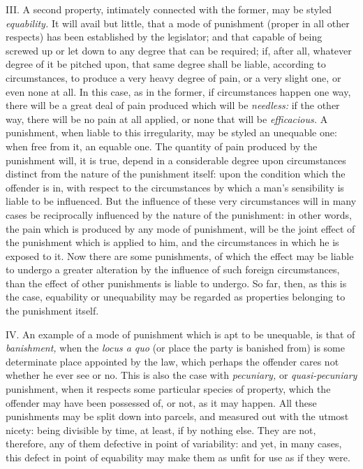 \documentclass[12pt]{report}
\begin{document}
III. A second property, intimately connected with the former, may be
styled \emph{equability.} It will avail but little, that a mode of
punishment (proper in all other respects) has been established by the
legislator; and that capable of being screwed up or let down to any
degree that can be required; if, after all, whatever degree of it be
pitched upon, that same degree shall be liable, according to
circumstances, to produce a very heavy degree of pain, or a very slight
one, or even none at all. In this case, as in the former, if
circumstances happen one way, there will be a great deal of pain
produced which will be \emph{needless:} if the other way, there will be
no pain at all applied, or none that will be \emph{efficacious.} A
punishment, when liable to this irregularity, may be styled an unequable
one: when free from it, an equable one. The quantity of pain produced by
the punishment will, it is true, depend in a considerable degree upon
circumstances distinct from the nature of the punishment itself: upon
the condition which the offender is in, with respect to the
circumstances by which a man's sensibility is liable to be influenced.
But the influence of these very circumstances will in many cases be
reciprocally influenced by the nature of the punishment: in other words,
the pain which is produced by any mode of punishment, will be the joint
effect of the punishment which is applied to him, and the circumstances
in which he is exposed to it. Now there are some punishments, of which
the effect may be liable to undergo a greater alteration by the
influence of such foreign circumstances, than the effect of other
punishments is liable to undergo. So far, then, as this is the case,
equability or unequability may be regarded as properties belonging to
the punishment itself.

IV. An example of a mode of punishment which is apt to be unequable, is
that of \emph{banishment,} when the \emph{locus a quo} (or place the
party is banished from) is some determinate place appointed by the law,
which perhaps the offender cares not whether he ever see or no. This is
also the case with \emph{pecuniary,} or \emph{quasi-pecuniary}
punishment, when it respects some particular species of property, which
the offender may have been possessed of, or not, as it may happen. All
these punishments may be split down into parcels, and measured out with
the utmost nicety: being divisible by time, at least, if by nothing
else. They are not, therefore, any of them defective in point of
variability: and yet, in many cases, this defect in point of equability
may make them as unfit for use as if they were.
\end{document}
